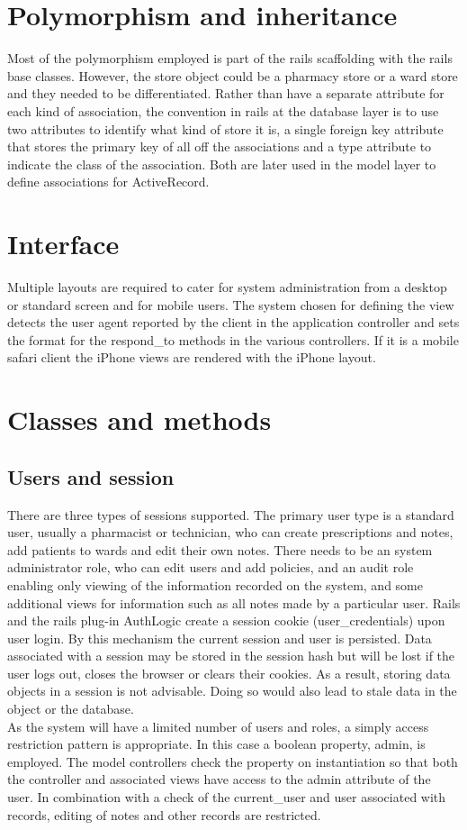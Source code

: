 \documentclass[letterpaper]{amsart}
\begin{document}
\section{Polymorphism and inheritance}
Most of the polymorphism employed is part of the rails scaffolding with the rails base classes.  However, the store object could be a pharmacy store or a ward store and they needed to be differentiated.  Rather than have a separate attribute for each kind of association, the convention in rails at the database layer is to use two attributes to identify what kind of store it is, a single foreign key attribute that stores the primary key of all off the associations and a type attribute to indicate the class of the association.  Both are later used in the model layer to define associations for ActiveRecord.
\section{Interface}
Multiple layouts are required to cater for system administration from a desktop or standard screen and for mobile users.  The system chosen for defining the view detects the user agent reported by the client in the application controller and sets the format for the respond\_to methods in the various controllers.  If it is a mobile safari client the iPhone views are rendered with the iPhone layout.  
\section{Classes and methods}
\subsection{Users and session} 
There are three types of sessions supported.  The primary user type is a standard user, usually a pharmacist or technician, who can create prescriptions and notes, add patients to wards and edit their own notes.  There needs to be an system administrator role, who can edit users and add policies, and an audit role enabling only viewing of the information recorded on the system, and some additional views for information such as all notes made by a particular user.
Rails and the rails plug-in AuthLogic create a session cookie (user\_credentials) upon user login.  By this mechanism the current session and user is persisted.  Data associated with a session may be stored in the session hash but will be lost if the user logs out, closes the browser or clears their cookies.  As a result, storing data objects in a session is not advisable.  Doing so would also lead to stale data in the object or the database.\\
As the system will have a limited number of users and roles, a simply access restriction pattern is appropriate.  In this case a boolean property, admin, is employed.  The model controllers check the property on instantiation so that both the controller and associated views have access to the admin attribute of the user.  In combination with a check of the current\_user and user associated with records, editing of notes and other records are restricted.
\end{document}

